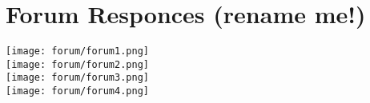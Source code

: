 \chapter{Forum Responces (rename me!)}
\texttt{[image: forum/forum1.png]} \\
\texttt{[image: forum/forum2.png]} \\
\texttt{[image: forum/forum3.png]} \\
\texttt{[image: forum/forum4.png]} \\